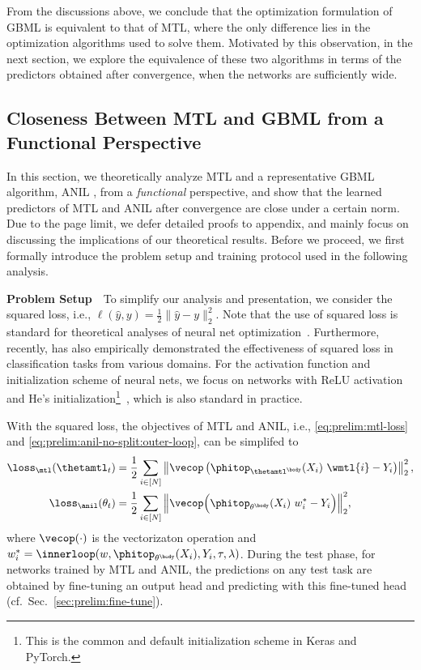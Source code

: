 \documentclass{article}
\begin{document}
From the discussions above, we conclude that the optimization formulation of GBML is equivalent to that of MTL, where the only difference lies in the optimization algorithms used to solve them. Motivated by this observation, in the next section, we explore the equivalence of these two algorithms in terms of the predictors obtained after convergence, when the networks are sufficiently wide. 

\subsection{Closeness Between MTL and GBML from a Functional Perspective}\label{sec:mtl=meta:functional}
In this section, we theoretically analyze MTL and a representative GBML algorithm, ANIL \cite{raghu2019rapid}, from a \textit{functional} perspective, and show that the learned predictors of MTL and ANIL after convergence are close under a certain norm. Due to the page limit, we defer detailed proofs to appendix, and mainly focus on discussing the implications of our theoretical results. Before we proceed, we first formally introduce the problem setup and training protocol used in the following analysis.

\textbf{Problem Setup}~~To simplify our analysis and presentation, we consider the squared loss, i.e., $\ell(\hat y,y) = \frac{1}{2}\|\hat y - y\|_2^2$. Note that the use of squared loss is standard for theoretical analyses of neural net optimization~\cite{ntk,du2019icml,AllenZhu2018ACT}. Furthermore, recently, \citet{hui2020evaluation} has also empirically demonstrated the effectiveness of squared loss in classification tasks from various domains. For the activation function and initialization scheme of neural nets, we focus on networks with ReLU activation and He's initialization\footnote{This is the common and default initialization scheme in Keras and PyTorch.}~\cite{resnet}, which is also standard in practice.

With the squared loss, the objectives of MTL and ANIL, i.e., \eqref{eq:prelim:mtl-loss} and \eqref{eq:prelim:anil-no-split:outer-loop}, can be simplifed to 
\begin{align*}
    \loss_\mtl(\thetamtl_t) & = \frac{1}{2} \sum_{i\in[N]}\left\|\vecop\left(\phitop_{\thetamtl^\body}(X_i)~\wmtl{i} - Y_i\right)\right\|_2^2, \\
\loss_\anil(\theta_t) &= \frac{1}{2}\sum_{i \in [N]} \Big\|\vecop\Big(\phitop_{\theta^\body}(X_i) ~ w_i^* - Y_i\Big)\Big\|_2^2,
\end{align*}
where $\vecop(\cdot)$ is the vectorizaton operation and $w_i^*=\innerloop(w, \phitop_{\theta^\body}(X_i), Y_i, \tau,\lambda)$. During the test phase, for networks trained by MTL and ANIL, the predictions on any test task are obtained by fine-tuning an output head and predicting with this fine-tuned head (cf.\ Sec.~\ref{sec:prelim:fine-tune}). 
\end{document}
